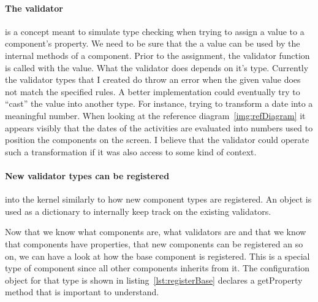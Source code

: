 \paragraph{The validator} is a concept meant to simulate type checking when trying to assign a value to a component's property. We need to be sure that the a value can be used by the internal methods of a component. Prior to the assignment, the validator function is called with the value. What the validator does depends on it's type. Currently the validator types that I created do throw an error when the given value does not match the specified rules. A better implementation could eventually try to ``cast'' the value into another type. For instance, trying to transform a date into a meaningful number. When looking at the reference diagram~\ref{img:refDiagram} it appears visibly that the dates of the activities are evaluated into numbers used to position the components on the screen. I believe that the validator could operate such a transformation if it was also access to some kind of context.

\paragraph{New validator types can be registered} into the kernel similarly to how new component types are registered. An object is used as a dictionary to internally keep track on the existing validators.




Now that we know what components are, what validators are and that we know that components have properties, that new components can be registered an so on, we can have a look at how the base component is registered. This is a special type of component since all other components inherits from it. The configuration object for that type is shown in listing~\ref{lst:registerBase} declares a getProperty method that is important to understand.

